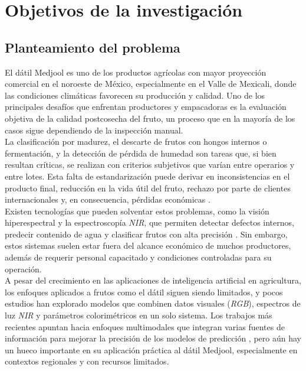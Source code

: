 
\chapter{Objetivos de la investigación}

\label{Chapter2}


\section{Planteamiento del problema}

El dátil Medjool es uno de los productos agrícolas con mayor proyección comercial en el noroeste de México, especialmente en el Valle de Mexicali, donde las condiciones climáticas favorecen su producción y calidad. Uno de los principales desafíos que enfrentan productores y empacadoras es la evaluación objetiva de la calidad postcosecha del fruto, un proceso que en la mayoría de los casos sigue dependiendo de la inspección manual.\\

La clasificación por madurez, el descarte de frutos con hongos internos o fermentación, y la detección de pérdida de humedad son tareas que, si bien resultan críticas, se realizan con criterios subjetivos que varían entre operarios y entre lotes. Esta falta de estandarización puede derivar en inconsistencias en el producto final, reducción en la vida útil del fruto, rechazo por parte de clientes internacionales y, en consecuencia, pérdidas económicas \parencite{perez-perez_evaluation_2021}.\\

Existen tecnologías que pueden solventar estos problemas, como la visión hiperespectral y la espectroscopía \textit{NIR}, que permiten detectar defectos internos, predecir contenido de agua y clasificar frutos con alta precisión \parencite{ulu_comparison_2025, yuan_determination_2025}. Sin embargo, estos sistemas suelen estar fuera del alcance económico de muchos productores, además de requerir personal capacitado y condiciones controladas para su operación.\\

A pesar del crecimiento en las aplicaciones de inteligencia artificial en agricultura, los enfoques aplicados a frutos como el dátil siguen siendo limitados, y pocos estudios han explorado modelos que combinen datos visuales (\textit{RGB}), espectros de luz \textit{NIR} y parámetros colorimétricos en un solo sistema. Los trabajos más recientes apuntan hacia enfoques multimodales que integran varias fuentes de información para mejorar la precisión de los modelos de predicción \parencite{gupta_fruveg-net_2024, apostolopoulos_general_2023}, pero aún hay un hueco importante en su aplicación práctica al dátil Medjool, especialmente en contextos regionales y con recursos limitados.\\

